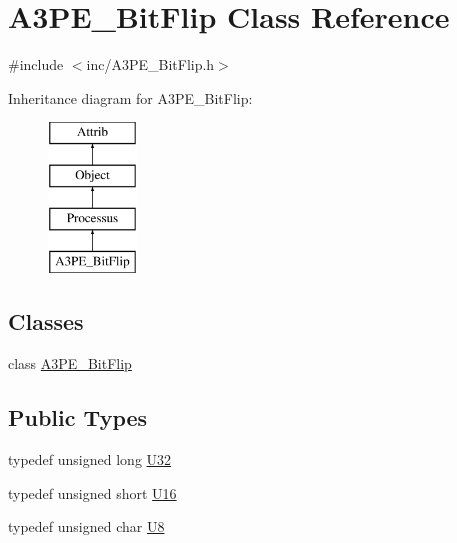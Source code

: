 \hypertarget{classA3PE__BitFlip}{}\section{A3\+P\+E\+\_\+\+Bit\+Flip Class Reference}
\label{classA3PE__BitFlip}


{\ttfamily \#include $<$inc/\+A3\+P\+E\+\_\+\+Bit\+Flip.\+h$>$}

Inheritance diagram for A3\+P\+E\+\_\+\+Bit\+Flip\+:\begin{figure}[H]
\begin{center}
\leavevmode
\includegraphics[height=4.000000cm]{classA3PE__BitFlip}
\end{center}
\end{figure}
\subsection*{Classes}
\begin{DoxyCompactItemize}
\item 
class \hyperlink{classA3PE__BitFlip_1_1A3PE__BitFlip}{A3\+P\+E\+\_\+\+Bit\+Flip}
\end{DoxyCompactItemize}
\subsection*{Public Types}
\begin{DoxyCompactItemize}
\item 
typedef unsigned long \hyperlink{classA3PE__BitFlip_aaf047b5086a5ea11db565ce8283edfb4}{U32}
\item 
typedef unsigned short \hyperlink{classA3PE__BitFlip_a0fa3a1814a6661198e0ce5156d1cc474}{U16}
\item 
typedef unsigned char \hyperlink{classA3PE__BitFlip_ac561e6bbd8d4101ecc32016314a07581}{U8}
\end{DoxyCompactItemize}

